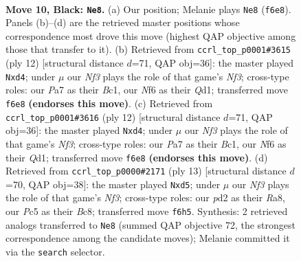 \documentclass[11pt]{article}
\begin{document}
\clearpage

\begin{figure}[p]\centering
\begin{subfigure}{0.46\textwidth}\centering
\resizebox{\linewidth}{!}{%
\newchessgame
\chessboard[
  setfen={r1bq1r1k/pp1pppbp/5np1/2p2n2/2P1P3/2N3P1/PP1P1PBP/R1BQNRK1 b - - 0 10},
  showmover=false,
  pgfstyle=straightmove, color=movearrow, markmove={f6-e8}
]}
\caption{}
\end{subfigure}\hfill
\begin{subfigure}{0.46\textwidth}\centering
\resizebox{\linewidth}{!}{%
\newchessgame
\chessboard[
  setfen={rnbq1rk1/pp1pppbp/5np1/8/2Pp4/2N2NP1/PP2PPBP/R1BQK2R w KQ - 0 7},
  showmover=false,
  pgfstyle=straightmove, color=movearrow, markmove={f3-d4}
]}
\caption{}
\end{subfigure}
\\[4pt]
\begin{subfigure}{0.46\textwidth}\centering
\resizebox{\linewidth}{!}{%
\newchessgame
\chessboard[
  setfen={rnbq1rk1/pp1pppbp/5np1/8/2Pp4/2N2NP1/PP2PPBP/R1BQK2R w KQ - 0 7},
  showmover=false,
  pgfstyle=straightmove, color=movearrow, markmove={f3-d4}
]}
\caption{}
\end{subfigure}\hfill
\begin{subfigure}{0.46\textwidth}\centering
\resizebox{\linewidth}{!}{%
\newchessgame
\chessboard[
  setfen={r1bq1rk1/ppp1ppbp/2n2np1/3P4/3P4/5NP1/PP2PPBP/RNBQ1RK1 b - - 0 7},
  showmover=false,
  pgfstyle=straightmove, color=movearrow, markmove={f6-d5}
]}
\caption{}
\end{subfigure}
\caption{\textbf{Move 10, Black: \texttt{Ne8}.} (a) Our position; Melanie plays \texttt{Ne8} (\texttt{f6e8}). Panels (b)--(d) are the retrieved master positions whose correspondence most drove this move (highest QAP objective among those that transfer to it). (b) Retrieved from \texttt{ccrl\_top\_p0001\#3615} (ply 12) [structural distance $d$=71, QAP obj=36]: the master played \texttt{Nxd4}; under $\mu$ our \emph{Nf3} plays the role of that game's \emph{Nf3}; cross-type roles: our \emph{P}a7 as their \emph{B}c1, our \emph{N}f6 as their \emph{Q}d1; transferred move \texttt{f6e8} \textbf{(endorses this move)}. (c) Retrieved from \texttt{ccrl\_top\_p0001\#3616} (ply 12) [structural distance $d$=71, QAP obj=36]: the master played \texttt{Nxd4}; under $\mu$ our \emph{Nf3} plays the role of that game's \emph{Nf3}; cross-type roles: our \emph{P}a7 as their \emph{B}c1, our \emph{N}f6 as their \emph{Q}d1; transferred move \texttt{f6e8} \textbf{(endorses this move)}. (d) Retrieved from \texttt{ccrl\_top\_p0000\#2171} (ply 13) [structural distance $d$=70, QAP obj=38]: the master played \texttt{Nxd5}; under $\mu$ our \emph{Nf3} plays the role of that game's \emph{Nf3}; cross-type roles: our \emph{p}d2 as their \emph{R}a8, our \emph{P}c5 as their \emph{B}c8; transferred move \texttt{f6h5}. Synthesis: 2 retrieved analogs transferred to \texttt{Ne8} (summed QAP objective 72, the strongest correspondence among the candidate moves); Melanie committed it via the \texttt{search} selector.}
\label{fig:thought-m19}
\end{figure}
\end{document}
